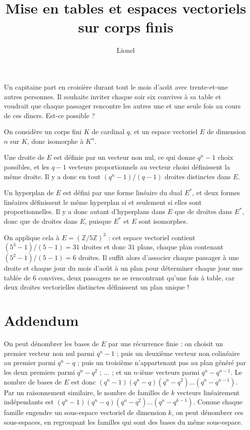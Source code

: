 \documentclass[a4paper,11pt]{article}
\title{Mise en tables et espaces vectoriels sur corps finis}
\author{Lionel \bsc{V\kern-1pt idal}}
\renewenvironment{abstract}%
  {\quotation\noindent\ignorespaces}%
  {\endquotation}
\newcommand{\Z}{\ensuremath{\mathbb{Z}}\xspace}
\begin{document}
\maketitle
\begin{abstract}
  Un capitaine part en croisière durant tout le mois d’août avec
  trente-et-une autres personnes. Il souhaite inviter chaque soir six
  convives à sa table et voudrait que chaque passager rencontre les autres
  une et une seule fois au cours de ces dîners. Est-ce possible ?
\end{abstract}

\bigskip
On considère un corps fini $K$ de cardinal $q$, et un espace vectoriel $E$
de dimension $n$ sur $K$, donc isomorphe à $K^n$.

Une droite de $E$ est définie par un vecteur non nul, ce qui donne $q^n-1$
choix possibles, et les $q-1$ vecteurs proportionnels au vecteur choisi
définissent la même droite. Il y a donc en tout $(q^n-1)/(q-1)$ droites
distinctes dans $E$.

Un hyperplan de $E$ est défini par une forme linéaire du dual $E^*$, et deux
formes linéaires définissent le même hyperplan si et seulement si elles sont
proportionnelles. Il y a donc autant d'hyperplans dans $E$ que de
droites dans $E^*$, donc que de droites dans $E$, puisque
$E^*$ et $E$ sont isomorphes.

On applique cela à $E=(\Z/5\Z)^3$ : cet espace vectoriel contient
$(5^3-1)/(5-1)=31$ droites et donc $31$ plans, chaque plan contenant
$(5^2-1)/(5-1)=6$ droites. Il suffit alors d'associer chaque passager à
une droite et chaque jour du mois d'août à un plan pour déterminer chaque
jour une tablée de $6$ convives, deux passagers ne se
rencontrant qu'une fois à table, car deux droites vectorielles distinctes
définissent un plan unique !

\section{Addendum}

On peut dénombrer les bases de $E$ par une récurrence finie : on
choisit un premier vecteur non nul parmi $q^n-1$ ; puis un
deuxième vecteur non colinéaire au premier parmi $q^n-q$ ; puis un troisième
n'appartenant pas au plan généré par les deux premiers parmi $q^n-q^2$ ;
$\dots$ ; et un $n$-ième vecteurs parmi $q^n-q^{n-1}$.
Le nombre de bases de $E$ est donc
$(q^n-1)(q^n-q)(q^n-q^2)\ldots(q^n-q^{n-1})$. Par un raisonnement similaire,
le nombre de familles de $k$ vecteurs linéairement indépendants est
$(q^n-1)(q^n-q)(q^n-q^2)\ldots(q^n-q^{k-1})$. Comme chaque famille
engendre un sous-espace vectoriel de dimension $k$, on peut dénombrer ces
sous-espaces, en regroupant les familles qui sont des bases du même
sous-espace.
\end{document}
